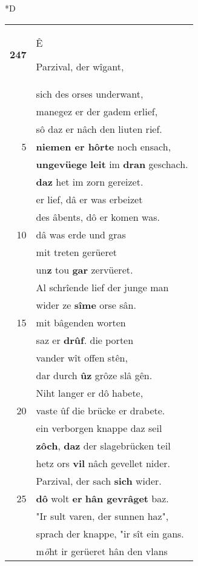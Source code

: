 \documentclass[8pt,a4paper,notitlepage]{article}
\begin{document}
\begin{table}[ht]
\begin{minipage}[t]{0.5\linewidth}
\small
\begin{center}*D
\end{center}
\begin{tabular}{rl}
\textbf{247} & \begin{large}Ê\end{large} Parzival, der wîgant,\\ 
 & sich des orses underwant,\\ 
 & manegez er der gadem erlief,\\ 
 & sô daz er nâch den liuten rief.\\ 
5 & \textbf{niemen er hôrte} noch ensach,\\ 
 & \textbf{ungevüege} \textbf{leit} im \textbf{dran} geschach.\\ 
 & \textbf{daz} het im zorn gereizet.\\ 
 & er lief, dâ er was erbeizet\\ 
 & des âbents, dô er komen was.\\ 
10 & dâ was erde und gras\\ 
 & mit treten gerüeret\\ 
 & un\textbf{z} tou \textbf{gar} zervüeret.\\ 
 & Al schrîende lief der junge man\\ 
 & wider ze \textbf{sîme} orse sân.\\ 
15 & mit bâgenden worten\\ 
 & saz er \textbf{drûf}. die porten\\ 
 & vander wît offen stên,\\ 
 & dar durch \textbf{ûz} grôze slâ gên.\\ 
 & Niht langer er dô habete,\\ 
20 & vaste ûf die brücke er drabete.\\ 
 & ein verborgen knappe daz seil\\ 
 & \textbf{zôch}, \textbf{daz} der slagebrücken teil\\ 
 & hetz ors \textbf{vil} nâch gevellet nider.\\ 
 & Parzival, der sach \textbf{sich} wider.\\ 
25 & \textbf{dô} wolt \textbf{er} \textbf{hân gevrâget} baz.\\ 
 & "Ir sult varen, der sunnen haz",\\ 
 & sprach der knappe, "ir sît ein gans.\\ 
 & m\textit{ö}ht ir gerüeret hân den vlans\\ 

\end{tabular}
\end{minipage}
\end{table}
\end{document}
